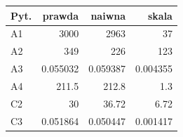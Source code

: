 \begin{tabular}{@{}lrrr@{}}\toprule
Pyt. & prawda & naiwna & skala \\\midrule
A1 & 3000 & 2963 & 37 \\
A2 & 349 & 226 & 123 \\
A3 & 0.055032 & 0.059387 & 0.004355 \\
A4 & 211.5 & 212.8 & 1.3 \\
C2 & 30 & 36.72 & 6.72 \\
C3 & 0.051864 & 0.050447 & 0.001417 \\
\bottomrule\end{tabular}
